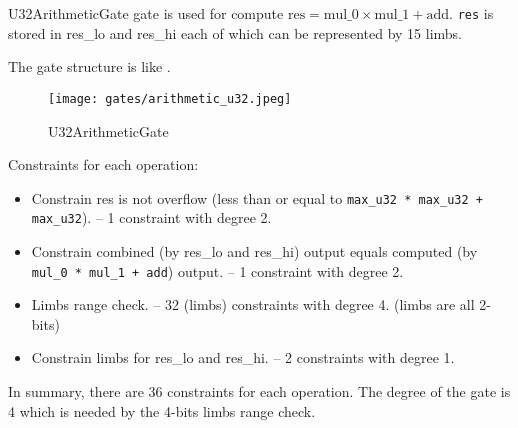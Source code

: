 
\hspace*{\fill}

\indent U32ArithmeticGate gate is used for compute $\text{res} = \text{mul\_0} \times \text{mul\_1} + \text{add}$. \verb|res| is stored in res\_lo and res\_hi each of which can be represented by 15 limbs.

The gate structure is like .

\begin{figure}[!ht]
    \centering
    \texttt{[image: gates/arithmetic\_u32.jpeg]}
    \caption{U32ArithmeticGate}
    \label{fig:arithmetic-u32}
\end{figure}

Constraints for each operation:
\begin{itemize}
    \item Constrain res is not overflow (less than or equal to \verb|max_u32 * max_u32 + max_u32|). -- 1 constraint with degree 2.
    \item Constrain combined (by res\_lo and res\_hi) output equals computed (by \verb|mul_0 * mul_1 + add|) output. -- 1 constraint with degree 2.
    \item Limbs range check. -- 32 (limbs) constraints with degree 4. (limbs are all 2-bits)
    \item Constrain limbs for res\_lo and res\_hi. -- 2 constraints with degree 1.
\end{itemize}

In summary, there are 36 constraints for each operation. The degree of the gate is 4 which is needed by the 4-bits limbs range check.
